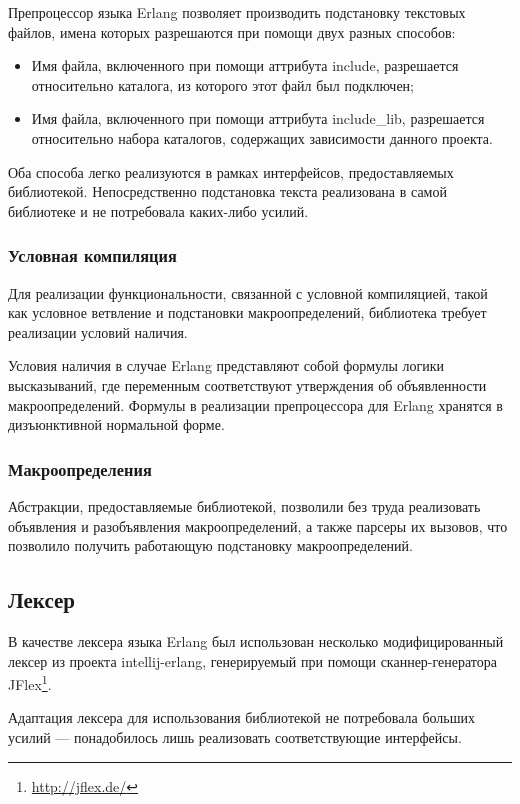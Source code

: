 Препроцессор языка Erlang позволяет производить подстановку текстовых файлов, имена которых разрешаются при помощи двух разных способов:

\begin{itemize}
\item Имя файла, включенного при помощи аттрибута include, разрешается относительно каталога, из которого этот файл был подключен;
\item Имя файла, включенного при помощи аттрибута include\_lib, разрешается относительно набора каталогов, содержащих зависимости данного проекта.
\end{itemize}

Оба способа легко реализуются в рамках интерфейсов, предоставляемых библиотекой. Непосредственно подстановка текста реализована в самой библиотеке и не потребовала каких-либо усилий.

\subsubsection{Условная компиляция}

Для реализации функциональности, связанной с условной компиляцией, такой как условное ветвление и подстановки макроопределений, библиотека требует реализации условий наличия.

Условия наличия в случае Erlang представляют собой формулы логики высказываний, где переменным соответствуют утверждения об объявленности макроопределений. Формулы в реализации препроцессора для Erlang хранятся в дизъюнктивной нормальной форме.

\subsubsection{Макроопределения}

Абстракции, предоставляемые библиотекой, позволили без труда реализовать объявления и разобъявления макроопределений, а также парсеры их вызовов, что позволило получить работающую подстановку макроопределений.

\subsection{Лексер}

В качестве лексера языка Erlang был использован несколько модифицированный лексер из проекта intellij-erlang, генерируемый при помощи сканнер-генератора JFlex\footnote{\url{http://jflex.de/}}.

Адаптация лексера для использования библиотекой не потребовала больших усилий --- понадобилось лишь реализовать соответствующие интерфейсы.

